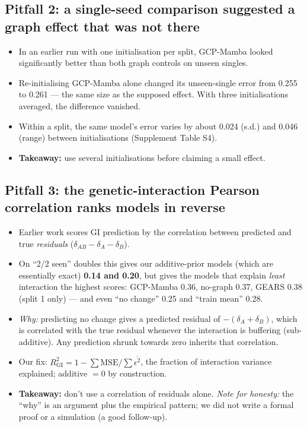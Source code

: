 \documentclass[10.5pt]{article}
\begin{document}
\subsection*{Pitfall 2: a single-seed comparison suggested a graph effect that was not there}
\begin{itemize}
\item In an earlier run with one initialisation per split, GCP-Mamba looked significantly better than both
graph controls on unseen singles.
\item Re-initialising GCP-Mamba alone changed its unseen-single error from 0.255 to 0.261 --- the same size as the
supposed effect. With three initialisations averaged, the difference vanished.
\item Within a split, the same model's error varies by about 0.024 (s.d.) and 0.046 (range) between
initialisations (Supplement Table S4).
\item \textbf{Takeaway:} use several initialisations before claiming a small effect.
\end{itemize}

\subsection*{Pitfall 3: the genetic-interaction Pearson correlation ranks models in reverse}
\begin{itemize}
\item Earlier work scores GI prediction by the correlation between predicted and true \emph{residuals}
($\delta_{AB}-\delta_A-\delta_B$).
\item On ``2/2 seen'' doubles this gives our additive-prior models (which are essentially exact) \textbf{0.14
and 0.20}, but gives the models that explain \emph{least} interaction the highest scores: GCP-Mamba 0.36,
no-graph 0.37, GEARS 0.38 (split 1 only) --- and even ``no change'' 0.25 and ``train mean'' 0.28.
\item \emph{Why:} predicting no change gives a predicted residual of $-(\delta_A+\delta_B)$, which is correlated
with the true residual whenever the interaction is buffering (sub-additive). Any prediction shrunk towards zero
inherits that correlation.
\item Our fix: $R^2_{\mathrm{GI}}=1-\sum \mathrm{MSE}/\sum \overline{\epsilon^2}$, the fraction of interaction
variance explained; additive $=0$ by construction.
\item \textbf{Takeaway:} don't use a correlation of residuals alone. \emph{Note for honesty:} the ``why'' is an
argument plus the empirical pattern; we did not write a formal proof or a simulation (a good follow-up).
\end{itemize}
\end{document}
